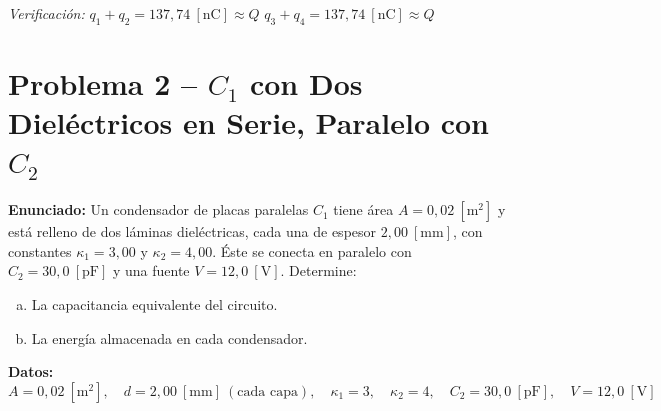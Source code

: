 \documentclass[12pt,letterpaper]{article}
\begin{document}
\noindent\textit{Verificaci\'on:} $q_1+q_2 = 137{,}74\ [\text{nC}] \approx Q$ \checkmark \quad $q_3+q_4 = 137{,}74\ [\text{nC}] \approx Q$ \checkmark

\newpage

\section*{Problema 2 -- $C_1$ con Dos Diel\'ectricos en Serie, Paralelo con $C_2$}

\noindent\textbf{Enunciado:}
Un condensador de placas paralelas $C_1$ tiene \'area $A = 0{,}02\ [\text{m}^2]$ y est\'a relleno de
dos l\'aminas diel\'ectricas, cada una de espesor $2{,}00\ [\text{mm}]$, con constantes
$\kappa_1 = 3{,}00$ y $\kappa_2 = 4{,}00$.
\'Este se conecta en paralelo con $C_2 = 30{,}0\ [\text{pF}]$ y una fuente $V = 12{,}0\ [\text{V}]$.
Determine:

\begin{enumerate}[(a)]
    \item La capacitancia equivalente del circuito.
    \item La energ\'ia almacenada en cada condensador.
\end{enumerate}

\medskip
\noindent\textbf{Datos:}
\[
    A = 0{,}02\ [\text{m}^2],\quad d = 2{,}00\ [\text{mm}]\ (\text{cada capa}),\quad
    \kappa_1 = 3,\quad \kappa_2 = 4,\quad C_2 = 30{,}0\ [\text{pF}],\quad V = 12{,}0\ [\text{V}]
\]
\end{document}
